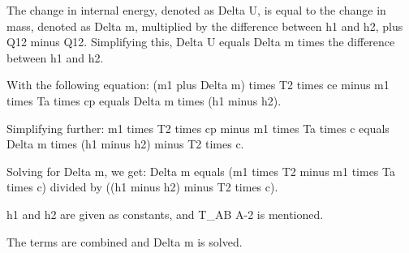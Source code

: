 The change in internal energy, denoted as Delta U, is equal to the change in mass, denoted as Delta m, multiplied by the difference between h1 and h2, plus Q12 minus Q12. Simplifying this, Delta U equals Delta m times the difference between h1 and h2.

With the following equation:
(m1 plus Delta m) times T2 times ce minus m1 times Ta times cp equals Delta m times (h1 minus h2).

Simplifying further:
m1 times T2 times cp minus m1 times Ta times c equals Delta m times (h1 minus h2) minus T2 times c.

Solving for Delta m, we get:
Delta m equals (m1 times T2 minus m1 times Ta times c) divided by ((h1 minus h2) minus T2 times c).

h1 and h2 are given as constants, and T_AB A-2 is mentioned.

The terms are combined and Delta m is solved.